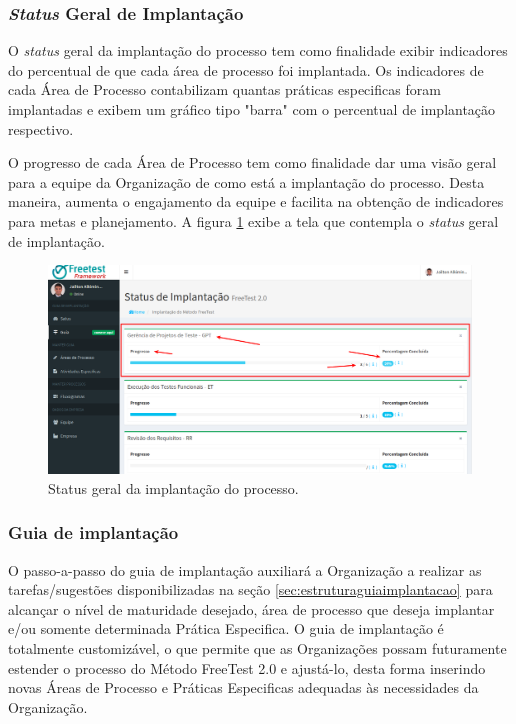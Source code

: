 \subsubsection{\textit{Status} Geral de Implantação}
\label{sec:statusimplantacao}

O \textit{status} geral da implantação do processo tem como finalidade exibir indicadores do percentual de que cada área de processo foi implantada. Os indicadores de cada Área de Processo contabilizam quantas práticas especificas foram implantadas e exibem um gráfico tipo "barra" com o percentual de implantação respectivo.

O progresso de cada Área de Processo tem como finalidade dar uma visão geral para a equipe da Organização de como está a implantação do processo. Desta maneira, aumenta o engajamento da equipe e facilita na obtenção de indicadores para metas e planejamento. A figura \ref{fig:fig68} exibe a tela que contempla o \textit{status} geral de implantação.

\begin{figure}[H]
\centering
\includegraphics[width=.90\textwidth]{fig/figura68.png}
\caption{Status geral da implantação do processo.}
\label{fig:fig68}
\end{figure}

\subsubsection{Guia de implantação}
\label{sec:passoapassoguia}

O passo-a-passo do guia de implantação auxiliará a Organização a realizar as tarefas/sugestões disponibilizadas na seção \ref{sec:estruturaguiaimplantacao} para alcançar o nível de maturidade desejado, área de processo que deseja implantar e/ou somente determinada Prática Especifica. O guia de implantação é totalmente customizável, o que permite que as Organizações possam futuramente estender o processo do Método FreeTest 2.0 e ajustá-lo, desta forma inserindo novas Áreas de Processo e Práticas Especificas adequadas às necessidades da Organização.

